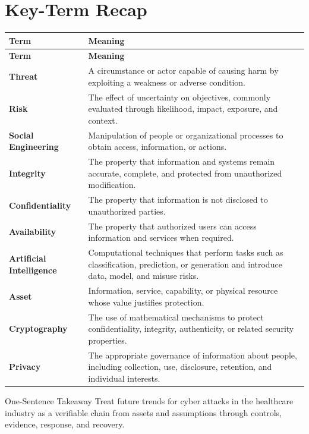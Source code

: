 \documentclass[11pt,letterpaper]{article}
\begin{document}
\section*{Key-Term Recap}
\begin{longtable}{>{\raggedright\arraybackslash}p{}>{\raggedright\arraybackslash}p{}}
\toprule\rowcolor{Navy}\color{white}\textbf{Term} & \color{white}\textbf{Meaning}\\\midrule
\endfirsthead
\toprule\rowcolor{Navy}\color{white}\textbf{Term} & \color{white}\textbf{Meaning}\\\midrule
\endhead
\textbf{Threat} & A circumstance or actor capable of causing harm by exploiting a weakness or adverse condition. \\\midrule
\textbf{Risk} & The effect of uncertainty on objectives, commonly evaluated through likelihood, impact, exposure, and context. \\\midrule
\textbf{Social Engineering} & Manipulation of people or organizational processes to obtain access, information, or actions. \\\midrule
\textbf{Integrity} & The property that information and systems remain accurate, complete, and protected from unauthorized modification. \\\midrule
\textbf{Confidentiality} & The property that information is not disclosed to unauthorized parties. \\\midrule
\textbf{Availability} & The property that authorized users can access information and services when required. \\\midrule
\textbf{Artificial Intelligence} & Computational techniques that perform tasks such as classification, prediction, or generation and introduce data, model, and misuse risks. \\\midrule
\textbf{Asset} & Information, service, capability, or physical resource whose value justifies protection. \\\midrule
\textbf{Cryptography} & The use of mathematical mechanisms to protect confidentiality, integrity, authenticity, or related security properties. \\\midrule
\textbf{Privacy} & The appropriate governance of information about people, including collection, use, disclosure, retention, and individual interests. \\\midrule
\bottomrule
\end{longtable}
\begin{CornellExamBox}{One-Sentence Takeaway}
Treat future trends for cyber attacks in the healthcare industry as a verifiable chain from assets and assumptions through controls, evidence, response, and recovery.
\end{CornellExamBox}
\end{document}
